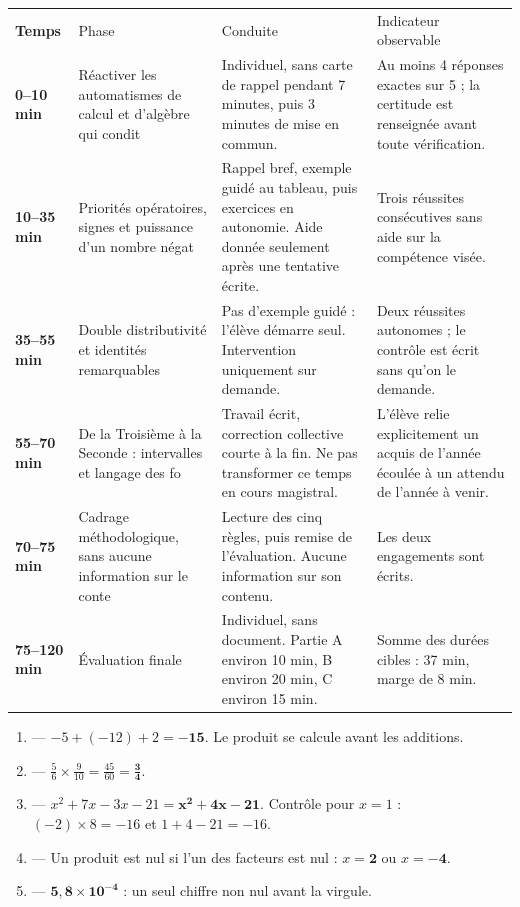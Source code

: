 \documentclass[10pt,a4paper]{article}
\begin{document}
\par\noindent\begin{tabularx}{\linewidth}{>{\bfseries}p{18mm} p{34mm} X X}
\rowcolor{Navy}\color{white}Temps & \color{white}Phase & \color{white}Conduite & \color{white}Indicateur observable \\
0--10 min & Réactiver les automatismes de calcul et d'algèbre qui condit & Individuel, sans carte de rappel pendant 7 minutes, puis 3 minutes de mise en commun. & Au moins 4 réponses exactes sur 5 ; la certitude est renseignée avant toute vérification. \\
10--35 min & Priorités opératoires, signes et puissance d'un nombre négat & Rappel bref, exemple guidé au tableau, puis exercices en autonomie. Aide donnée seulement après une tentative écrite. & Trois réussites consécutives sans aide sur la compétence visée. \\
35--55 min & Double distributivité et identités remarquables & Pas d'exemple guidé : l'élève démarre seul. Intervention uniquement sur demande. & Deux réussites autonomes ; le contrôle est écrit sans qu'on le demande. \\
55--70 min & De la Troisième à la Seconde : intervalles et langage des fo & Travail écrit, correction collective courte à la fin. Ne pas transformer ce temps en cours magistral. & L'élève relie explicitement un acquis de l'année écoulée à un attendu de l'année à venir. \\
70--75 min & Cadrage méthodologique, sans aucune information sur le conte & Lecture des cinq règles, puis remise de l'évaluation. Aucune information sur son contenu. & Les deux engagements sont écrits. \\
75--120 min & Évaluation finale & Individuel, sans document. Partie A environ 10 min, B environ 20 min, C environ 15 min. & Somme des durées cibles : 37 min, marge de 8 min. \\
\end{tabularx}
\newpage{}
\begin{enumerate}
\item {} --- $-5 + (-12) + 2 = \mathbf{-15}$. Le produit se calcule avant les additions.
\item {} --- $\frac{5}{6}\times\frac{9}{10}=\frac{45}{60}=\mathbf{\frac{3}{4}}$.
\item {} --- $x^2+7x-3x-21=\mathbf{x^2+4x-21}$. Contrôle pour $x=1$ : $(-2)\times 8=-16$ et $1+4-21=-16$.
\item {} --- Un produit est nul si l'un des facteurs est nul : $x=\mathbf{2}$ ou $x=\mathbf{-4}$.
\item {} --- $\mathbf{5{,}8\times 10^{-4}}$ : un seul chiffre non nul avant la virgule.
\end{enumerate}
\end{document}
